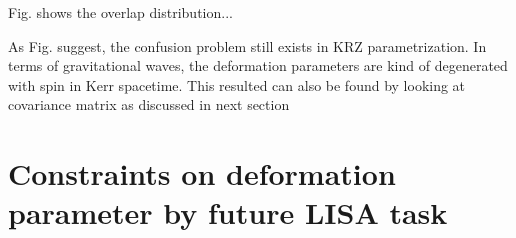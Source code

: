 \documentclass{article}
\begin{document}
Fig. shows the overlap distribution...

As Fig. suggest, the confusion problem still exists in KRZ parametrization. In terms of gravitational waves, the deformation parameters are kind of degenerated with spin in Kerr spacetime. This resulted can also be found by looking at covariance matrix as discussed in next section
\section{Constraints on deformation parameter by future LISA task}



\end{document}
